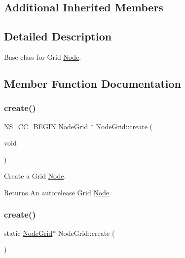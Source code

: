 \subsection*{Additional Inherited Members}


\subsection{Detailed Description}
Base class for Grid \hyperlink{classNode}{Node}. 

\subsection{Member Function Documentation}
\mbox{\label{classNodeGrid_a9d8226f4e0568774109ddc36f8f3bef3}} 
\subsubsection{\texorpdfstring{create()}{create()}\hspace{0.1cm}{\footnotesize\ttfamily [1/2]}}
{\footnotesize\ttfamily N\+S\+\_\+\+C\+C\+\_\+\+B\+E\+G\+IN \hyperlink{classNodeGrid}{Node\+Grid} $\ast$ Node\+Grid\+::create (\begin{DoxyParamCaption}\item[{void}]{ }\end{DoxyParamCaption})\hspace{0.3cm}{\ttfamily [static]}}

Create a Grid \hyperlink{classNode}{Node}.

\begin{DoxyReturn}{Returns}
An autorelease Grid \hyperlink{classNode}{Node}. 
\end{DoxyReturn}
\mbox{\label{classNodeGrid_a7935b1f30d51ed7def0be83b4cab5dff}} 
\subsubsection{\texorpdfstring{create()}{create()}\hspace{0.1cm}{\footnotesize\ttfamily [2/2]}}
{\footnotesize\ttfamily static \hyperlink{classNodeGrid}{Node\+Grid}$\ast$ Node\+Grid\+::create (\begin{DoxyParamCaption}{ }\end{DoxyParamCaption})\hspace{0.3cm}{\ttfamily [static]}}

